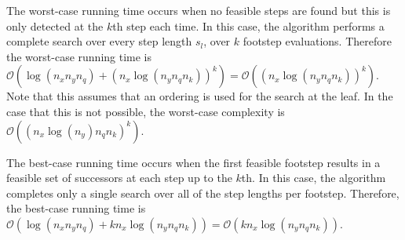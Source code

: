 The worst-case running time occurs when no feasible steps are found but this is only detected at the $k$th step each time. In this case, the algorithm performs a complete search over every step length $s_l$, over $k$ footstep evaluations. Therefore the worst-case running time is $\mathcal{O}(\log(n_xn_yn_q)+(n_x\log(n_yn_qn_k))^k)=\mathcal{O}((n_x\log(n_yn_qn_k))^k)$. {\color{orange}Note that this assumes that an ordering is used for the search at the leaf. In the case that this is not possible, the worst-case complexity is $\mathcal{O}((n_x\log(n_y)n_qn_k)^k)$.}

The best-case running time occurs when the first feasible footstep results in a feasible set of successors at each step up to the $k$th. In this case, the algorithm completes only a single search over all of the step lengths per footstep. Therefore, the best-case running time is $\mathcal{O}(\log(n_xn_yn_q)+kn_x\log(n_yn_qn_k))=\mathcal{O}(kn_x\log(n_yn_qn_k))$.